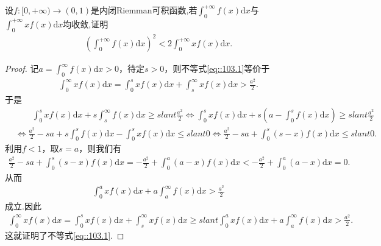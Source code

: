 \documentclass[../../main.tex]{subfiles}
\begin{document}
\begin{example}
设$f:[0,+\infty)\to (0,1)$是内闭Riemman可积函数,若$\int_0^{+\infty} f(x) \mathrm{d}x$与$\int_0^{+\infty} x f(x) \mathrm{d}x$均收敛,证明
\begin{align}
\left( \int_0^{+\infty} f(x) \mathrm{d}x \right)^2 < 2 \int_0^{+\infty} x f(x) \mathrm{d}x.\label{eq::103.1}
\end{align}
\end{example}
\begin{proof}
记$a=\int_0^{\infty} f(x) \mathrm{d}x>0$，待定$s>0$，则不等式\eqref{eq::103.1}等价于
\begin{align*}
\int_0^{\infty} x f(x) \mathrm{d}x = \int_0^s x f(x) \mathrm{d}x + \int_s^{\infty} x f(x) \mathrm{d}x > \frac{a^2}{2}.
\end{align*}
于是
\begin{align*}
&\quad \quad \int_0^s x f(x) \mathrm{d}x + s \int_s^{\infty} f(x) \mathrm{d}x \geqslant slant \frac{a^2}{2} \Longleftrightarrow \int_0^s x f(x) \mathrm{d}x + s \left( a - \int_0^s f(x) \mathrm{d}x \right) \geqslant slant \frac{a^2}{2} \\
&\Longleftrightarrow \frac{a^2}{2} - sa + s \int_0^s f(x) \mathrm{d}x - \int_0^s x f(x) \mathrm{d}x \leqslant slant 0 \Longleftrightarrow \frac{a^2}{2} - sa + \int_0^s (s - x) f(x) \mathrm{d}x \leqslant slant 0.
\end{align*}
利用$f<1$，取$s=a$，则我们有
\begin{align*}
\frac{a^2}{2} - sa + \int_0^s (s - x) f(x) \mathrm{d}x = -\frac{a^2}{2} + \int_0^a (a - x) f(x) \mathrm{d}x < -\frac{a^2}{2} + \int_0^a (a - x) \mathrm{d}x = 0.
\end{align*}
从而
\begin{align*}
\int_0^a x f(x) \mathrm{d}x + a \int_a^{\infty} f(x) \mathrm{d}x > \frac{a^2}{2}
\end{align*}
成立.因此
\begin{align*}
\int_0^{\infty} x f(x) \mathrm{d}x = \int_0^s x f(x) \mathrm{d}x + \int_s^{\infty} x f(x) \mathrm{d}x \geqslant slant \int_0^a x f(x) \mathrm{d}x + a \int_a^{\infty} f(x) \mathrm{d}x > \frac{a^2}{2}.
\end{align*}
这就证明了不等式\eqref{eq::103.1}.
\end{proof}
\end{document}
